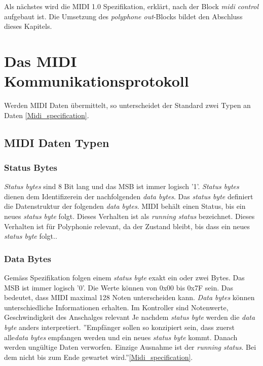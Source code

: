Als nächstes wird die MIDI 1.0 Spezifikation, erklärt, nach der Block \textit{midi control} aufgebaut ist. Die Umsetzung des \textit{polyphone out}-Blocks bildet den Abschluss dieses Kapitels.\\


\newpage
\section{Das MIDI Kommunikationsprotokoll}\label{sect.midi_spezification}
Werden MIDI Daten übermittelt, so unterscheidet der Standard zwei Typen an Daten \ref{Midi_specification}.

\subsection{MIDI Daten Typen}\label{datenytpen}
\subsubsection*{Status Bytes}
\textit{Status bytes} sind 8 Bit lang und das MSB ist immer logisch '1'.  \textit{Status bytes} dienen dem Identifizerein der nachfolgenden \textit{data bytes}. Das \textit{status byte} definiert die Datenstruktur der folgenden \textit{data bytes}.
\newline
\newline
MIDI behält einen Status, bis ein neues \textit{status byte} folgt. Dieses Verhalten ist als \textit{running status} bezeichnet. Dieses Verhalten ist für Polyphonie relevant, da der Zustand bleibt, bis dass ein neues \textit{status byte} folgt..

\subsubsection*{Data Bytes}
Gemäss Spezifikation folgen einem \textit{status byte} exakt ein oder zwei Bytes. Das MSB ist immer logisch '0'. Die Werte können von 0x00 bis 0x7F sein. Das bedeutet, dass MIDI maximal 128 Noten unterscheiden kann.
\newline
\newline
\textit{Data bytes} können unterschiedliche Informationen erhalten. Im Kontroller sind Notenwerte, Geschwindigkeit des Anschalges relevant
\newline
\newline
Je nachdem \textit{status byte} werden die \textit{data byte} anders interpretiert. 
\newline
\newline
''Empfänger sollen so konzipiert sein, dass zuerst alle\textit{data bytes} empfangen werden und ein neues \textit{status byte} kommt. Danach werden ungültige Daten verworfen. Einzige Ausnahme ist der \textit{running status}. Bei dem nicht bis zum Ende gewartet wird.''\ref{Midi_specification}.\\

